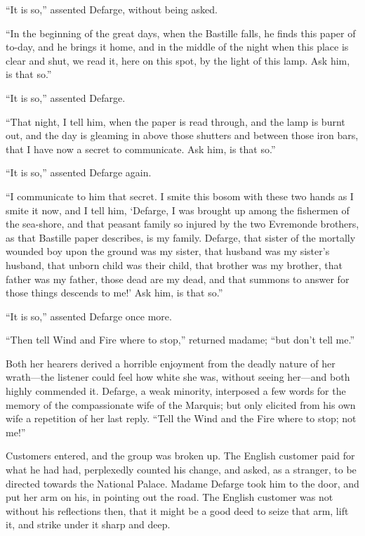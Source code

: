 ``It is so,'' assented Defarge, without being asked.

``In the beginning of the great days, when the Bastille falls, he
finds this paper of to-day, and he brings it home, and in the middle
of the night when this place is clear and shut, we read it, here on
this spot, by the light of this lamp.  Ask him, is that so.''

``It is so,'' assented Defarge.

``That night, I tell him, when the paper is read through, and the lamp
is burnt out, and the day is gleaming in above those shutters and
between those iron bars, that I have now a secret to communicate.
Ask him, is that so.''

``It is so,'' assented Defarge again.

``I communicate to him that secret.  I smite this bosom with these two
hands as I smite it now, and I tell him, `Defarge, I was brought up
among the fishermen of the sea-shore, and that peasant family so
injured by the two Evremonde brothers, as that Bastille paper describes,
is my family.  Defarge, that sister of the mortally wounded boy upon
the ground was my sister, that husband was my sister's husband, that
unborn child was their child, that brother was my brother, that
father was my father, those dead are my dead, and that summons to
answer for those things descends to me!' Ask him, is that so.''

``It is so,'' assented Defarge once more.

``Then tell Wind and Fire where to stop,'' returned madame; ``but don't tell me.''

Both her hearers derived a horrible enjoyment from the deadly nature
of her wrath---the listener could feel how white she was, without
seeing her---and both highly commended it.  Defarge, a weak minority,
interposed a few words for the memory of the compassionate wife of
the Marquis; but only elicited from his own wife a repetition of her
last reply.  ``Tell the Wind and the Fire where to stop; not me!''

Customers entered, and the group was broken up.  The English customer
paid for what he had had, perplexedly counted his change, and asked,
as a stranger, to be directed towards the National Palace.
Madame Defarge took him to the door, and put her arm on his, in
pointing out the road.  The English customer was not without his
reflections then, that it might be a good deed to seize that arm,
lift it, and strike under it sharp and deep.

